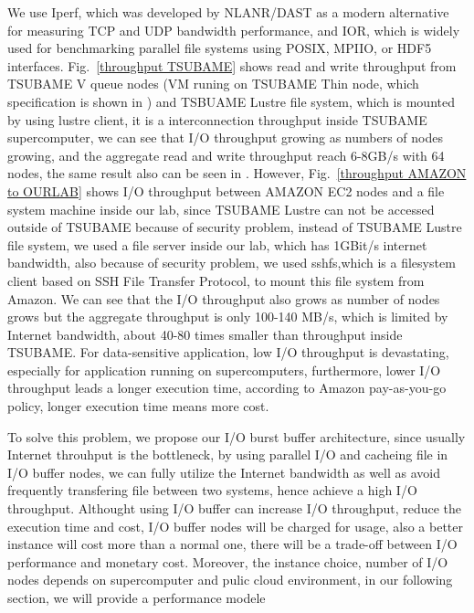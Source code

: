 We use Iperf\cite{iperf}, which was developed by NLANR/DAST as a modern alternative for measuring TCP and UDP bandwidth performance, and IOR\cite{IOR}, which is widely used for benchmarking parallel file systems using POSIX, MPIIO, or HDF5 interfaces.
Fig.~\ref{throughput TSUBAME} shows read and write throughput from TSUBAME V queue nodes (VM runing on TSUBAME Thin node, which specification is shown in ) and TSBUAME Lustre file system, which is mounted by using lustre client, it is a interconnection throughput inside TSUBAME supercomputer, we can see that I/O throughput growing as numbers of nodes growing, and the aggregate read and write throughput reach 6-8GB/s with 64 nodes, the same result also can be seen in \cite{checkpointing}.
However, Fig.~\ref{throughput AMAZON to OURLAB} shows I/O throughput between AMAZON EC2 nodes and a file system machine inside our lab, since TSUBAME Lustre can not be accessed outside of TSUBAME because of security problem, instead of TSUBAME Lustre file system, we used a file server inside our lab, which has 1GBit/s internet bandwidth, also because of security problem, we used sshfs\cite{sshfs},which is a filesystem client based on SSH File Transfer Protocol, to mount this file system from Amazon.
We can see that the I/O throughput also grows as number of nodes grows but the aggregate throughput is only 100-140 MB/s, which is limited by Internet bandwidth, about 40-80 times smaller than throughput inside TSUBAME.
For data-sensitive application, low I/O throughput is devastating, especially for application running on supercomputers, furthermore, lower I/O throughput leads a longer execution time, according to Amazon pay-as-you-go policy, longer execution time means more cost.

To solve this problem, we propose our I/O burst buffer architecture, since usually Internet throuhput is the bottleneck, by using parallel I/O and cacheing file in I/O buffer nodes, we can fully utilize the Internet bandwidth as well as avoid frequently transfering file between two systems, hence achieve a high I/O throughput.
Althought using I/O buffer can increase I/O throughput, reduce the execution time and cost, I/O buffer nodes will be charged for usage, also a better instance will cost more than a normal one, there will be a trade-off between I/O performance and monetary cost.
Moreover, the instance choice, number of I/O nodes depends on supercomputer and pulic cloud environment, in our following section, we will provide a performance modele



